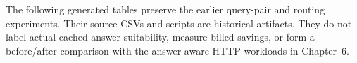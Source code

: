 The following generated tables preserve the earlier query-pair and routing
experiments. Their source CSVs and scripts are historical artifacts. They do
not label actual cached-answer suitability, measure billed savings, or form a
before/after comparison with the answer-aware HTTP workloads in Chapter~6.







